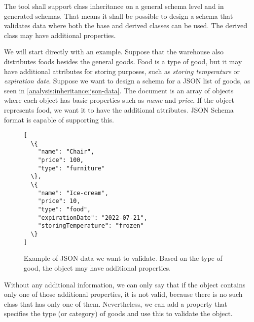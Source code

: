 

\begin{requirement}
    The tool shall support class inheritance on a general schema level and in generated schemas. That means it shall be possible to design a schema that validates data where both the base and derived classes can be used. The derived class may have additional properties.
    \label{requirement:inheritance}
\end{requirement}

\begin{showcase}
  We will start directly with an example. Suppose that the warehouse also distributes foods besides the general goods. Food is a type of good, but it may have additional attributes for storing purposes, such as \textit{storing temperature} or \textit{expiration date}. Suppose we want to design a schema for a JSON list of goods, as seen in \autoref{analysis:inheritance:json-data}. The document is an array of objects where each object has basic properties such as \textit{name} and \textit{price}. If the object represents food, we want it to have the additional attributes. JSON Schema format is capable of supporting this.

  \begin{figure}[H]\centering
      \begin{Verbatim}[commandchars=\\\{\}]
[
  \{
    "name": "Chair",
    "price": 100,
    "type": "furniture"
  \},
  \{
    "name": "Ice-cream",
    "price": 10,
    "type": "food",
    "expirationDate": "2022-07-21",
    "storingTemperature": "frozen"
  \}
]
      \end{Verbatim}
      \caption{Example of JSON data we want to validate. Based on the type of good, the object may have additional properties.}
      \label{analysis:inheritance:json-data}
  \end{figure}

    Without any additional information, we can only say that if the object contains only one of those additional properties, it is not valid, because there is no such class that has only one of them. Nevertheless, we can add a property that specifies the type (or category) of goods and use this to validate the object.
\end{showcase}

